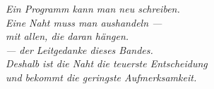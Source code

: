 \begin{geschichte}
\begin{center}
\end{center}
\end{geschichte}

\bigskip
\begin{flushright}
\itshape\color{grau}
Ein Programm kann man neu schreiben.\\
Eine Naht muss man aushandeln ---\\
mit allen, die daran hängen.\\[10pt]
\normalfont\color{grau}\upshape
--- der Leitgedanke dieses Bandes.\\
\itshape Deshalb ist die Naht die teuerste Entscheidung\\
und bekommt die geringste Aufmerksamkeit.
\end{flushright}
